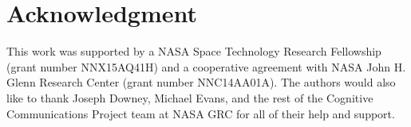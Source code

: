 \documentclass[journal]{IEEEtran}
\begin{document}






%


\section*{Acknowledgment}
This work was supported by a NASA Space Technology Research Fellowship (grant number NNX15AQ41H) and a cooperative agreement with NASA John H. Glenn Research Center (grant number NNC14AA01A).  The authors would also like to thank Joseph Downey, Michael Evans, and the rest of the Cognitive Communications Project team at NASA GRC for all of their help and support.


\ifCLASSOPTIONcaptionsoff
  \newpage
\fi
\end{document}
